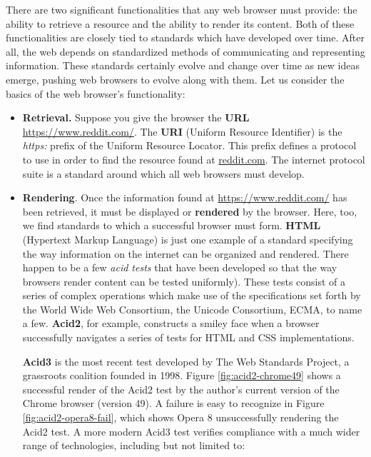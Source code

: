 \documentclass[a4paper, 11pt]{article} %
\begin{document}
There are two significant functionalities that any web browser must provide: the ability to retrieve a resource and the ability to render its content. Both of these functionalities are closely tied to standards which have developed over time. After all, the web depends on standardized methods of communicating and representing information. These standards certainly evolve and change over time as new ideas emerge, pushing web browsers to evolve along with them. Let us consider the basics of the web browser's functionality:

\begin{itemize}
	\item \textbf{Retrieval.} Suppose you give the browser the \textbf{URL} \url{https://www.reddit.com/}. The \textbf{URI} (Uniform Resource Identifier) is the \textit{https:} prefix of the Uniform Resource Locator. This prefix defines a protocol to use in order to find the resource found at \url{reddit.com}. The internet protocol suite is a standard around which all web browsers must develop.
	
	\item \textbf{Rendering}. Once the information found at \url{https://www.reddit.com/} has been retrieved, it must be displayed or \textbf{rendered} by the browser. Here, too, we find standards to which a successful browser must form. \textbf{HTML} (Hypertext Markup Language) is just one example of a standard specifying the way information on the internet can be organized and rendered. There happen to be a few \textit{acid tests} that have been developed so that the way browsers render content can be tested uniformly). These tests consist of a series of complex operations which make use of the specifications set forth by the World Wide Web Consortium, the Unicode Consortium, ECMA, to name a few. \textbf{Acid2}, for example, constructs a smiley face when a browser successfully navigates a series of tests for HTML and CSS implementations. \cite{AcidT95:online}
	
	\textbf{Acid3} is the most recent test developed by The Web Standards Project, a grassroots coalition founded in 1998. \cite{TheWe20:online} Figure \ref{fig:acid2-chrome49} shows a successful render of the Acid2 test by the author's current version of the Chrome browser (version 49). A failure is easy to recognize in Figure \ref{fig:acid2-opera8-fail}, which shows Opera 8 unsuccessfully rendering the Acid2 test. A more modern Acid3 test verifies compliance with a much wider range of technologies, including but not limited to:
	

\end{itemize}
\end{document}
